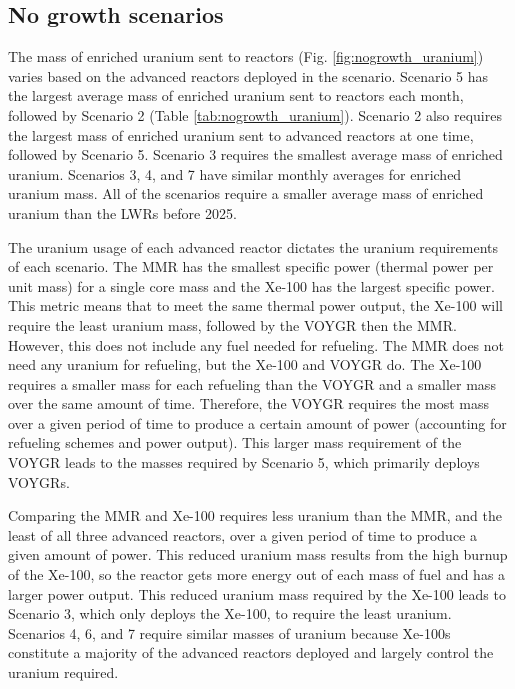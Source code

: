 \subsection{No growth scenarios}
The mass of enriched uranium sent to reactors (Fig. \ref{fig:nogrowth_uranium})
varies based on the advanced reactors deployed in the scenario. 
Scenario 5 has the largest average mass of enriched uranium sent to 
reactors each month, followed by Scenario 2 (Table 
\ref{tab:nogrowth_uranium}). 
Scenario 2 also requires the largest mass of enriched uranium sent 
to advanced reactors at one time, followed by Scenario 5.
Scenario 3 requires the smallest average 
mass of enriched uranium. Scenarios 3, 4, and 7 
have similar monthly averages for enriched uranium mass. All of the 
scenarios require a smaller 
average mass of enriched uranium than the \glspl{LWR} before 2025. 

The uranium usage of each advanced reactor dictates the uranium requirements 
of each scenario. The \gls{MMR} has the smallest specific power (thermal 
power per unit mass) for a single core mass and the Xe-100 has the largest 
specific power. This metric means that to meet the same thermal power 
output, the Xe-100 will require the least uranium mass, followed by the 
VOYGR then the \gls{MMR}. However, this does not include any fuel needed for 
refueling. The \gls{MMR} does not need any uranium for refueling, but the 
Xe-100 and VOYGR do. The Xe-100 requires a smaller mass for each refueling 
than the VOYGR and a smaller mass over the same amount of time. Therefore, 
the VOYGR requires the most mass over a given period of time to produce 
a certain amount of power (accounting for refueling schemes and power  
output). This larger mass requirement of the VOYGR leads to the 
masses required by Scenario 5, 
which primarily deploys VOYGRs.

Comparing the \gls{MMR} and Xe-100 requires less uranium than the \gls{MMR}, 
and the least of all three advanced reactors, over a given period of time 
to produce a given amount of power. This reduced uranium mass results 
from the high burnup of the Xe-100, so the reactor gets more energy out of 
each mass of fuel and has a larger power output. This reduced uranium mass 
required by the Xe-100 leads to Scenario 3, which only deploys the 
Xe-100, to require the least uranium. Scenarios 4, 6, and 7 require similar 
masses of uranium because Xe-100s constitute a majority of the advanced 
reactors deployed and largely control the uranium required. 

